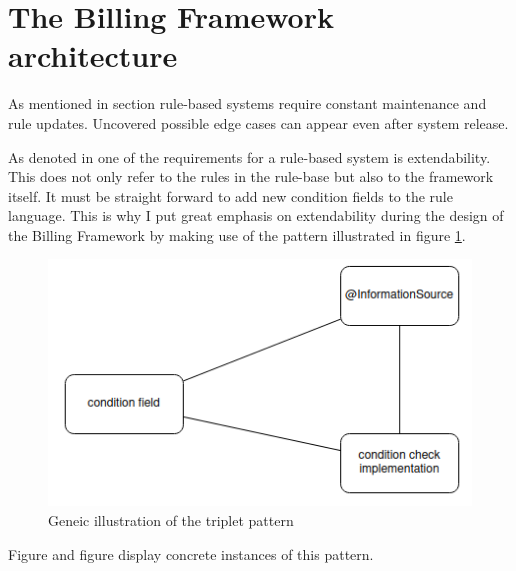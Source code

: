 \section{The Billing Framework architecture}\label{sec:the-code-derivation-pipeline}

As mentioned in section \addref rule-based systems require constant maintenance and rule updates.
Uncovered possible edge cases can appear even after system release.

As denoted in \addref one of the requirements for a rule-based system is extendability.
This does not only refer to the rules in the rule-base but also to the framework itself.
It must be straight forward to add new condition fields to the rule language.
This is why
I put great emphasis on extendability during the design of the Billing Framework
by making use of the pattern illustrated in figure \ref{fig:condition-triplet-pattern}.


\begin{figure}
    \centering
    \includegraphics[width=0.75\linewidth]{./figures/condition-triplet-pattern}
    \caption{Geneic illustration of the triplet pattern}
    \label{fig:condition-triplet-pattern}
\end{figure}

Figure \addref and figure \addref display concrete instances of this pattern.


